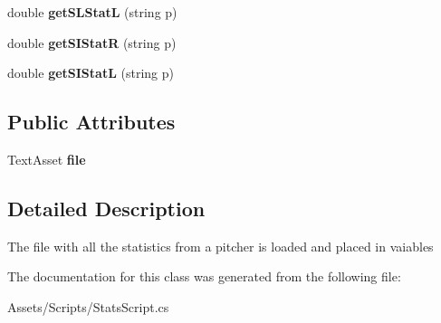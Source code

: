\begin{DoxyCompactItemize}
\item 
double {\bfseries get\+S\+L\+StatL} (string p)\hypertarget{class_stats_script_a23d4b27cdd2249c3a2504ed01e54cad4}{}\label{class_stats_script_a23d4b27cdd2249c3a2504ed01e54cad4}

\item 
double {\bfseries get\+S\+I\+StatR} (string p)\hypertarget{class_stats_script_a453b355ac1935f86dd737dc510fe8298}{}\label{class_stats_script_a453b355ac1935f86dd737dc510fe8298}

\item 
double {\bfseries get\+S\+I\+StatL} (string p)\hypertarget{class_stats_script_ab3bb92a72ef25ca7dff63c5e62d38991}{}\label{class_stats_script_ab3bb92a72ef25ca7dff63c5e62d38991}

\end{DoxyCompactItemize}
\subsection*{Public Attributes}
\begin{DoxyCompactItemize}
\item 
Text\+Asset {\bfseries file}\hypertarget{class_stats_script_abe4dc3e41da180a73b9d8a5511e8e817}{}\label{class_stats_script_abe4dc3e41da180a73b9d8a5511e8e817}

\end{DoxyCompactItemize}


\subsection{Detailed Description}
The file with all the statistics from a pitcher is loaded and placed in vaiables 



The documentation for this class was generated from the following file\+:\begin{DoxyCompactItemize}
\item 
Assets/\+Scripts/Stats\+Script.\+cs\end{DoxyCompactItemize}
